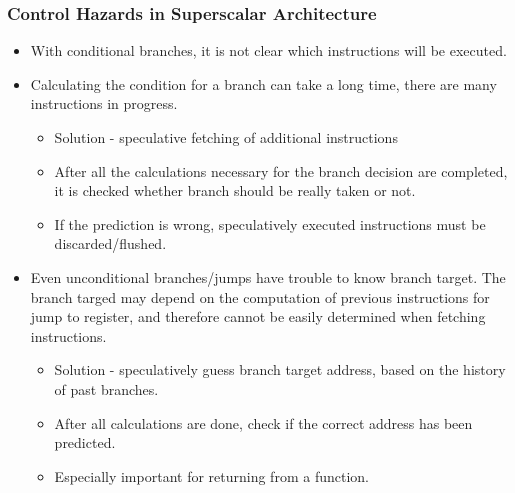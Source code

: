 \documentclass[aspectratio=169]{beamer}
\begin{document}
\begin{frame}
\frametitle{Control Hazards in Superscalar Architecture}

\begin{itemize}
\item With conditional branches, it is not clear which instructions will be executed.
\item Calculating the condition for a branch can take a long time, there are many instructions in progress.
\begin{itemize}
\item Solution - speculative fetching of additional instructions
\item After all the calculations necessary for the branch decision are completed, it is checked whether branch should be really taken or not.
\item If the prediction is wrong, speculatively executed instructions must be discarded/flushed.
\end{itemize}
\item Even unconditional branches/jumps have trouble to know branch target. The branch targed may depend on the computation of previous instructions for jump to register, and therefore cannot be easily determined when fetching instructions.
\begin{itemize}
\item Solution - speculatively guess branch target address, based on the history of past branches.
\item After all calculations are done, check if the correct address has been predicted.
\item Especially important for returning from a function.
\end{itemize}
\end{itemize}

\end{frame}
\end{document}
